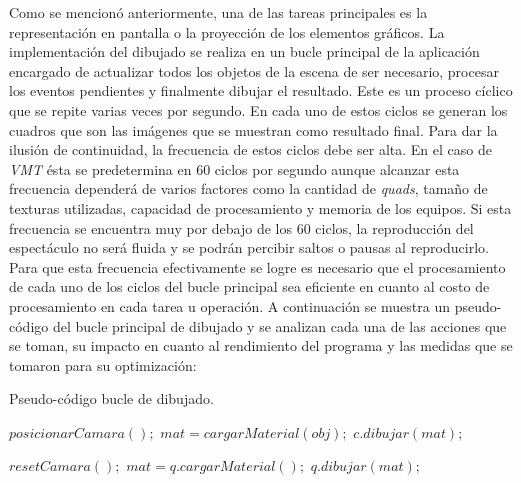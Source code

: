 Como se mencionó anteriormente, una de las tareas principales es la representación en pantalla o la proyección de los elementos gráficos. La implementación del dibujado se realiza en un bucle principal de la aplicación encargado de actualizar todos los objetos de la escena de ser necesario, procesar los eventos pendientes y finalmente dibujar el resultado. Este es un proceso cíclico que se repite varias veces por segundo.
En cada uno de estos ciclos se generan los cuadros que son las imágenes que se muestran como resultado final.
Para dar la ilusión de continuidad, la frecuencia de estos ciclos debe ser alta. En el caso de \emph{VMT} ésta se predetermina en 60 ciclos por segundo aunque alcanzar esta frecuencia dependerá de varios factores como la cantidad de \emph{quads}, tamaño de texturas utilizadas, capacidad de procesamiento y memoria de los equipos.
Si esta frecuencia se encuentra muy por debajo de los 60 ciclos, la reproducción del espectáculo no será fluida y se podrán percibir saltos o pausas al reproducirlo.
Para que esta frecuencia efectivamente se logre es necesario que el procesamiento de cada uno de los ciclos del bucle principal sea eficiente en cuanto al costo de procesamiento en cada tarea u operación. A continuación se muestra un pseudo-código del bucle principal de dibujado y se analizan cada una de las acciones que se toman, su impacto en cuanto al rendimiento del programa y las medidas que se tomaron para su optimización:

\begin{algorithm}
    \caption{Pseudo-código bucle de dibujado.}
    \label{alg:mainLoop}
    \begin{algorithmic}
      \State $posicionarCamara();$
             \State $mat = cargarMaterial(obj);$
             \State $c.dibujar(mat);$
         \EndFor
      \EndFor

      \State $resetCamara();$
         \State $mat = q.cargarMaterial();$
         \State $q.dibujar(mat);$
      \EndFor
    \end{algorithmic}
\end{algorithm}



